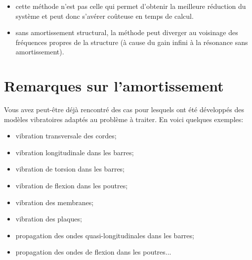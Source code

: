 \medskipvm
\begin{itemize}
  \item cette méthode n'est pas celle qui permet d'obtenir la meilleure réduction du système et peut donc s'avérer coûteuse en temps de calcul.
  \item sans amortissement structural, la méthode peut diverger au voisinage des fréquences propres de la structure (à cause du gain infini à la résonance sans amortissement).
\end{itemize}








\medskip
\section{Remarques sur l'amortissement}

Vous avez peut-être déjà rencontré des cas pour lesquels ont été développés des modèles vibratoires adaptés au problème à traiter. En voici quelques exemples:
\begin{itemize}
  \item vibration transversale des cordes;
  \item vibration longitudinale dans les barres;
  \item vibration de torsion dans les barres;
  \item vibration de flexion dans les poutres;
  \item vibration des membranes;
  \item vibration des plaques;
  \item propagation des ondes quasi-longitudinales dans les barres;
  \item propagation des ondes de flexion dans les poutres...
\end{itemize}

